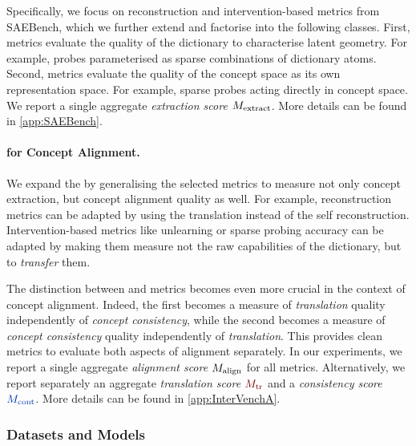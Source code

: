 \documentclass{article}
\begin{document}
Specifically, we focus on reconstruction and intervention-based metrics from SAEBench, which we further extend and factorise into the following classes. First, \InterVenchLatent metrics evaluate the quality of the dictionary to characterise latent geometry. For example, probes parameterised as sparse combinations of dictionary atoms. Second, \InterVenchConcept metrics evaluate the quality of the concept space as its own representation space. For example, sparse probes acting directly in concept space.
We report a single aggregate \emph{extraction score} $M_{\mathrm{extract}}$. More details can be found in \cref{app:SAEBench}.

\paragraph{\InterVenchA for Concept Alignment.} We expand the \InterVench by generalising the selected metrics to measure not only concept extraction, but concept alignment quality as well. For example, reconstruction metrics can be adapted by using the translation instead of the self reconstruction. Intervention-based metrics like unlearning or sparse probing accuracy can be adapted by making them measure not the raw capabilities of the dictionary, but to \emph{transfer} them.

The distinction between \InterVenchLatent and \InterVenchConcept metrics becomes even more crucial in the context of concept alignment. Indeed, the first becomes a measure of \emph{translation} quality independently of \emph{concept consistency}, while the second becomes a measure of \emph{concept consistency} quality independently of \emph{translation}.
%
This provides clean metrics to evaluate both aspects of alignment separately. In our experiments, we report a single aggregate \emph{alignment score} $M_{\mathrm{align}}$ for all metrics. Alternatively, we report separately an aggregate \emph{translation score} $\Mtr$ and a \emph{consistency score} $\Mcont$.
%
More details can be found in \cref{app:InterVenchA}.

\subsubsection{Datasets and Models}
\end{document}
